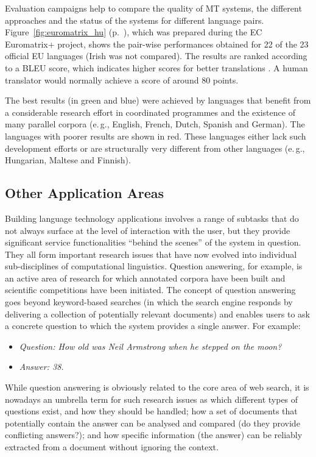 \begin{multicols}{2}
  Evaluation campaigns help to compare the quality of MT systems, the different approaches and the status of the systems for different language pairs. Figure~\ref{fig:euromatrix_hu} (p.~\pageref{fig:euromatrix_hu}), which was prepared during the EC Euromatrix+ project, shows the pair-wise performances obtained for 22 of the 23 official EU languages (Irish was not compared). The results are ranked according to a BLEU score, which indicates higher scores for better translations \cite{bleu1}. A human translator would normally achieve a score of around 80 points.

  The best results (in green and blue) were achieved by languages that benefit from a considerable research effort in coordinated programmes and the existence of many parallel corpora (e.\,g., English, French, Dutch, Spanish and German). The languages with poorer results are shown in red. These languages either lack such development efforts or are structurally very different from other languages (e.\,g., Hungarian, Maltese and Finnish).

  \subsection{Other Application Areas}

  Building language technology applications involves a range of subtasks that do not always surface at the level of interaction with the user, but they provide significant service functionalities “behind the scenes” of the system in question. They all form important research issues that have now evolved into individual sub-disciplines of computational linguistics.  Question answering, for example, is an active area of research for which annotated corpora have been built and scientific competitions have been initiated. The concept of question answering goes beyond keyword-based searches (in which the search engine responds by delivering a collection of potentially relevant documents) and enables users to ask a concrete question to which the system provides a single answer. For example:
  \begin{itemize}
    \item[] \textit{Question: How old was Neil Armstrong when he stepped on the moon?}
    \item[] \textit{Answer: 38.}
  \end{itemize}

  While question answering is obviously related to the core area of web search, it is nowadays an umbrella term for such research issues as which different types of questions exist, and how they should be handled; how a set of documents that potentially contain the answer can be analysed and compared (do they provide conflicting answers?); and how specific information (the answer) can be reliably extracted from a document without ignoring the context. 


\end{multicols}
